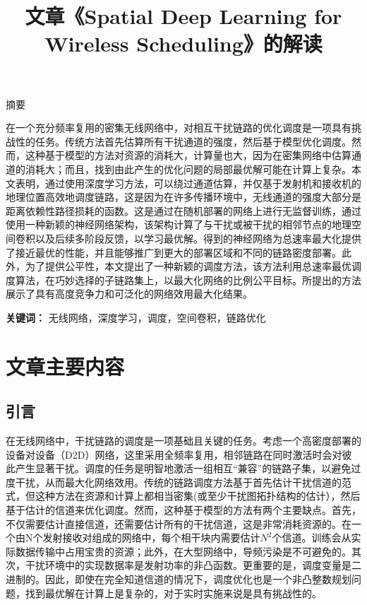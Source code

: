 \documentclass[UTF8, 12pt]{article}
\numberwithin{figure}{section}
\begin{document}
\title{\heiti 文章《Spatial Deep Learning for Wireless Scheduling》的解读}
\date{}
\maketitle
\begin{center}
    \heiti \large 摘要
\end{center}

在一个充分频率复用的密集无线网络中，对相互干扰链路的优化调度是一项具有挑战性的任务。传统方法首先估算所有干扰通道的强度，然后基于模型优化调度。然而，这种基于模型的方法对资源的消耗大，计算量也大，因为在密集网络中估算通道的消耗大；而且，找到由此产生的优化问题的局部最优解可能在计算上复杂。本文表明，通过使用深度学习方法，可以绕过通道估算，并仅基于发射机和接收机的地理位置高效地调度链路，这是因为在许多传播环境中，无线通道的强度大部分是距离依赖性路径损耗的函数。这是通过在随机部署的网络上进行无监督训练，通过使用一种新颖的神经网络架构，该架构计算了与干扰或被干扰的相邻节点的地理空间卷积以及后续多阶段反馈，以学习最优解。得到的神经网络为总速率最大化提供了接近最优的性能，并且能够推广到更大的部署区域和不同的链路密度部署。此外，为了提供公平性，本文提出了一种新颖的调度方法，该方法利用总速率最优调度算法，在巧妙选择的子链路集上，以最大化网络的比例公平目标。所提出的方法展示了具有高度竞争力和可泛化的网络效用最大化结果。

\vspace{1em}

\heiti \textbf{关键词：} 无线网络，深度学习，调度，空间卷积，链路优化
\clearpage

\section{文章主要内容}
\subsection{引言}
\songti 在无线网络中，干扰链路的调度是一项基础且关键的任务。考虑一个高密度部署的设备对设备（D2D）网络，这里采用全频率复用，相邻链路在同时激活时会对彼此产生显著干扰。调度的任务是明智地激活一组相互“兼容”的链路子集，以避免过度干扰，从而最大化网络效用。传统的链路调度方法基于首先估计干扰信道的范式，但这种方法在资源和计算上都相当密集(或至少干扰图拓扑结构的估计），然后基于估计的信道来优化调度。然而，这种基于模型的方法有两个主要缺点。首先，不仅需要估计直接信道，还需要估计所有的干扰信道，这是非常消耗资源的。在一个由N个发射接收对组成的网络中，每个相干块内需要估计$N^2$个信道。训练会从实际数据传输中占用宝贵的资源；此外，在大型网络中，导频污染是不可避免的。其次，干扰环境中的实现数据率是发射功率的非凸函数。更重要的是，调度变量是二进制的。因此，即使在完全知道信道的情况下，调度优化也是一个非凸整数规划问题，找到最优解在计算上是复杂的，对于实时实施来说是具有挑战性的。
\end{document}
